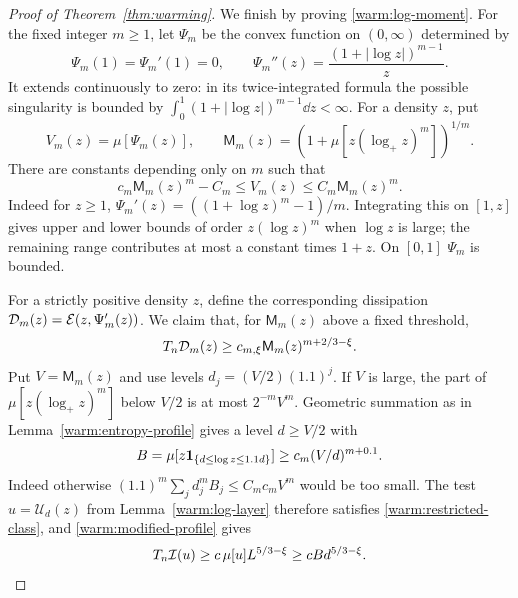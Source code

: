 \begin{proof}[Proof of Theorem~\ref{thm:warming}]
We finish by proving \eqref{warm:log-moment}.  For the fixed integer
\(m\ge1\), let \(\Psi_m\) be the convex function on \((0,\infty)\)
determined by
\[
 \Psi_m(1)=\Psi_m'(1)=0,\qquad
 \Psi_m''(z)=\frac{(1+|\log z|)^{m-1}}{z}.
\]
It extends continuously to zero: in its twice-integrated formula the
possible singularity is bounded by
\(\int_0^1(1+|\log z|)^{m-1}\dd z<\infty\).
For a density \(z\), put
\[
 V_m(z)=\mu[\Psi_m(z)],\qquad
 \mathsf M_m(z)=\left(1+\mu[z(\log_+z)^m]\right)^{1/m}.
\]
There are constants depending only on \(m\) such that
\begin{equation}
 c_m\mathsf M_m(z)^m-C_m
       \le V_m(z)\le C_m\mathsf M_m(z)^m.                 \label{warm:moment-comparison}
\end{equation}
Indeed for \(z\ge1\),
\(\Psi_m'(z)=((1+\log z)^m-1)/m\).  Integrating this on
\([1,z]\) gives upper and lower bounds of order
\(z(\log z)^m\) when \(\log z\) is large; the remaining range
contributes at most a constant times \(1+z\).  On \([0,1]\)
\(\Psi_m\) is bounded.

For a strictly positive density \(z\), define the corresponding
dissipation \(\mathcal D_m(z)=\mathcal E(z,\Psi_m'(z))\).
We claim that, for \(\mathsf M_m(z)\) above a fixed threshold,
\begin{equation}
 T_n\mathcal D_m(z)
       \ge c_{m,\xi}\mathsf M_m(z)^{m+2/3-\xi}.
                                                               \label{warm:moment-dissipation}
\end{equation}
Put \(V=\mathsf M_m(z)\) and use levels
\(d_j=(V/2)(1.1)^j\).  If \(V\) is large, the part of
\(\mu[z(\log_+z)^m]\) below \(V/2\) is at most \(2^{-m}V^m\).
Geometric summation as in Lemma~\ref{warm:entropy-profile} gives a level
\(d\ge V/2\) with
\[
 B=\mu[z\mathbf 1_{\{d\le\log z\le1.1d\}}]
       \ge c_m(V/d)^{m+0.1}.
\]
Indeed otherwise
\((1.1)^m\sum_jd_j^mB_j\le C_m c_m V^m\) would be too small.
The test \(u=\mathcal U_d(z)\) from Lemma~\ref{warm:log-layer} therefore
satisfies \eqref{warm:restricted-class}, and
\eqref{warm:modified-profile} gives
\begin{equation}
 T_n\mathcal I(u)\ge c\,\mu[u]L^{5/3-\xi}
       \ge cB d^{5/3-\xi}.                               \label{warm:moment-layer-profile}
\end{equation}


\end{proof}
